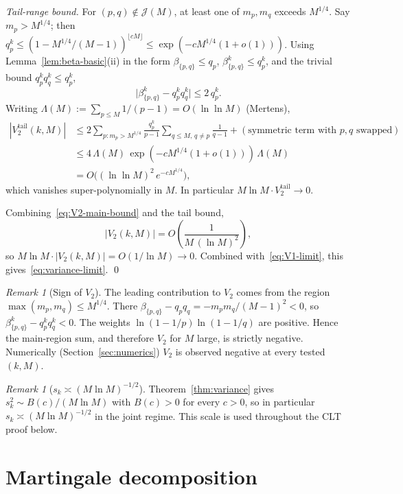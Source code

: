 \documentclass[11pt]{article}
\theoremstyle{remark}
\newtheorem{remark}[theorem]{Remark}
\begin{document}
\emph{Tail-range bound.}
For $(p,q) \notin \mathcal{J}(M)$, at least one of $m_p, m_q$ exceeds $M^{1/4}$. Say $m_p > M^{1/4}$; then $q_p^k \leq (1 - M^{1/4}/(M-1))^{\lfloor cM \rfloor} \leq \exp(-c M^{1/4}(1+o(1)))$. Using Lemma~\ref{lem:beta-basic}(ii) in the form $\beta_{\{p,q\}} \leq q_p$, $\beta_{\{p,q\}}^k \leq q_p^k$, and the trivial bound $q_p^k q_q^k \leq q_p^k$,
\[
\bigl|\beta_{\{p,q\}}^k - q_p^k q_q^k\bigr| \leq 2\, q_p^k.
\]
Writing $\Lambda(M) := \sum_{p \leq M} 1/(p-1) = O(\ln \ln M)$ (Mertens),
\begin{align*}
|V_2^{\mathrm{tail}}(k, M)| &\leq 2 \sum_{p \colon m_p > M^{1/4}} \frac{q_p^k}{p-1} \sum_{q \leq M,\, q \neq p} \frac{1}{q-1} + (\text{symmetric term with }p, q\text{ swapped})\\
&\leq 4\, \Lambda(M)\, \exp(-c M^{1/4}(1+o(1)))\, \Lambda(M)\\
&= O\bigl((\ln \ln M)^2\, e^{-c M^{1/4}}\bigr),
\end{align*}
which vanishes super-polynomially in $M$. In particular $M \ln M \cdot V_2^{\mathrm{tail}} \to 0$.

Combining~\eqref{eq:V2-main-bound} and the tail bound,
\begin{equation}\label{eq:V2-total-bound}
|V_2(k, M)| = O\!\left(\frac{1}{M\,(\ln M)^2}\right),
\end{equation}
so $M \ln M \cdot |V_2(k, M)| = O(1/\ln M) \to 0$. Combined with~\eqref{eq:V1-limit}, this gives~\eqref{eq:variance-limit}. \qed

\begin{remark}[Sign of $V_2$]\label{rem:V2-sign}
The leading contribution to $V_2$ comes from the region $\max(m_p, m_q) \leq M^{1/4}$. There $\beta_{\{p,q\}} - q_p q_q = -m_p m_q/(M-1)^2 < 0$, so $\beta_{\{p,q\}}^k - q_p^k q_q^k < 0$. The weights $\ln(1-1/p)\ln(1-1/q)$ are positive. Hence the main-region sum, and therefore $V_2$ for $M$ large, is strictly negative. Numerically (Section~\ref{sec:numerics}) $V_2$ is observed negative at every tested $(k, M)$.
\end{remark}

\begin{remark}[$s_k \asymp (M \ln M)^{-1/2}$]\label{rem:sk-asymp}
Theorem~\ref{thm:variance} gives $s_k^2 \sim B(c)/(M \ln M)$ with $B(c) > 0$ for every $c > 0$, so in particular $s_k \asymp (M \ln M)^{-1/2}$ in the joint regime. This scale is used throughout the CLT proof below.
\end{remark}

\section{Martingale decomposition}\label{sec:martingale}
\end{document}
